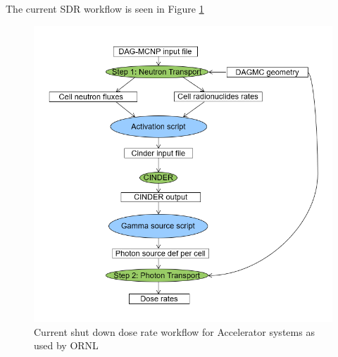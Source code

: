 The current SDR workflow is seen in Figure \ref{rnucs_r2s}
\begin{figure}[ht!]
\begin{centering}
\includegraphics[scale=0.4]{../figs/rnucs_r2s.png}
\caption{Current shut down dose rate workflow for Accelerator systems as used by ORNL}
\label{rnucs_r2s}
\end{centering}
\end{figure}
